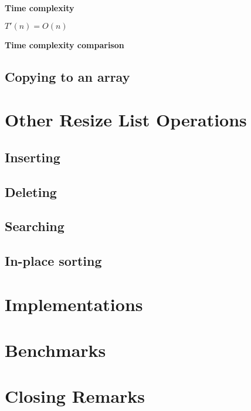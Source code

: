 \documentclass{article}
\newcommand{\tcomplex}{\textbf{Time complexity}}
\newcommand{\tcomplexcmp}{\textbf{Time complexity comparison}}
\newcommand{\timefn}{T}
\newcommand{\timenewfn}{\timefn'}
\newcommand{\bigo}{O}
\newcommand{\varnitems}{n}
\begin{document}
	\tcomplex
	
	$\timenewfn(\varnitems) = \bigo(\varnitems)$
	
	\tcomplexcmp
	
	\subsection{Copying to an array}
	
	\section{Other Resize List Operations}
	
	\subsection{Inserting}
	
	\subsection{Deleting}
	
	\subsection{Searching}
	
	\subsection{In-place sorting}
	
	\section{Implementations}
	
	\section{Benchmarks}
	
	\section{Closing Remarks}
\end{document}

